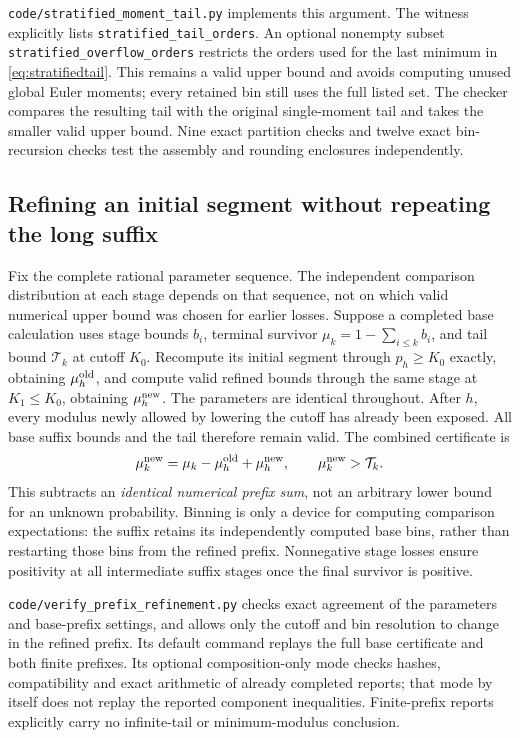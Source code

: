 \documentclass[11pt]{article}
\begin{document}
\texttt{code/stratified\_moment\_tail.py} implements this argument.
The witness explicitly lists \texttt{stratified\_tail\_orders}.
An optional nonempty subset \texttt{stratified\_overflow\_orders} restricts
the orders used for the last minimum in \eqref{eq:stratifiedtail}.
This remains a valid upper bound and avoids computing unused global
Euler moments; every retained bin still uses the full listed set.
The checker compares the resulting tail with the original single-moment
tail and takes the smaller valid upper bound. Nine exact partition checks
and twelve exact bin-recursion checks test the assembly and rounding
enclosures independently.

\subsection{Refining an initial segment without repeating the long suffix}
Fix the complete rational parameter sequence. The independent comparison
distribution at each stage depends on that sequence, not on which valid
numerical upper bound was chosen for earlier losses. Suppose a completed
base calculation uses stage bounds $b_i$, terminal survivor
$\mu_k=1-\sum_{i\leq k}b_i$, and tail bound $\mathcal T_k$ at cutoff
$K_0$. Recompute its initial segment through $p_h\geq K_0$ exactly,
obtaining $\mu_h^{\rm old}$, and compute valid refined bounds through
the same stage at $K_1\leq K_0$, obtaining $\mu_h^{\rm new}$.
The parameters are identical throughout. After $h$, every modulus newly
allowed by lowering the cutoff has already been exposed. All base suffix
bounds and the tail therefore remain valid. The combined certificate is
\[
 \mu_k^{\rm new}=\mu_k-\mu_h^{\rm old}+\mu_h^{\rm new},\qquad
 \mu_k^{\rm new}>\mathcal T_k.
\]
This subtracts an \emph{identical numerical prefix sum}, not an arbitrary
lower bound for an unknown probability. Binning is only a device for
computing comparison expectations: the suffix retains its independently
computed base bins, rather than restarting those bins from the refined
prefix. Nonnegative stage losses ensure positivity at all intermediate
suffix stages once the final survivor is positive.

\texttt{code/verify\_prefix\_refinement.py} checks exact agreement of the
parameters and base-prefix settings, and allows only the cutoff and bin
resolution to change in the refined prefix. Its default command replays
the full base certificate and both finite prefixes. Its optional
composition-only mode checks hashes, compatibility and exact arithmetic
of already completed reports; that mode by itself does not replay the
reported component inequalities. Finite-prefix reports explicitly carry
no infinite-tail or minimum-modulus conclusion.
\end{document}
